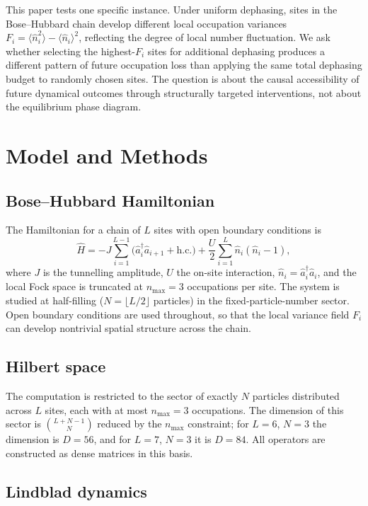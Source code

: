 \documentclass[11pt,a4paper]{article}
\newcommand{\Fi}{F_i}
\newcommand{\nop}{\hat{n}}
\newcommand{\adag}{\hat{a}^\dagger}
\newcommand{\aop}{\hat{a}}
\begin{document}
This paper tests one specific instance.
Under uniform dephasing, sites in the Bose--Hubbard chain develop different
local occupation variances $\Fi = \langle\nop_i^2\rangle -
\langle\nop_i\rangle^2$, reflecting the degree of local number
fluctuation.
We ask whether selecting the highest-$\Fi$ sites for additional dephasing
produces a different pattern of future occupation loss than applying the
same total dephasing budget to randomly chosen sites.
The question is about the causal accessibility of future dynamical
outcomes through structurally targeted interventions, not about the
equilibrium phase diagram.

\section{Model and Methods}
\label{sec:methods}

\subsection{Bose--Hubbard Hamiltonian}

The Hamiltonian for a chain of $L$ sites with open boundary conditions is
\begin{equation}
\label{eq:ham}
\hat{H} = -J\sum_{i=1}^{L-1}\bigl(\adag_i\aop_{i+1} + \mathrm{h.c.}\bigr)
         + \frac{U}{2}\sum_{i=1}^{L}\nop_i(\nop_i - 1),
\end{equation}
where $J$ is the tunnelling amplitude, $U$ the on-site interaction,
$\nop_i = \adag_i\aop_i$, and the local Fock space is truncated at
$n_{\max}=3$ occupations per site.
The system is studied at half-filling ($N=\lfloor L/2\rfloor$ particles) in
the fixed-particle-number sector.
Open boundary conditions are used throughout, so that the local variance
field $\Fi$ can develop nontrivial spatial structure across the chain.

\subsection{Hilbert space}

The computation is restricted to the sector of exactly $N$ particles
distributed across $L$ sites, each with at most $n_{\max}=3$ occupations.
The dimension of this sector is $\binom{L+N-1}{N}$ reduced by the
$n_{\max}$ constraint; for $L=6$, $N=3$ the dimension is $D=56$, and for
$L=7$, $N=3$ it is $D=84$.
All operators are constructed as dense matrices in this basis.

\subsection{Lindblad dynamics}
\end{document}
